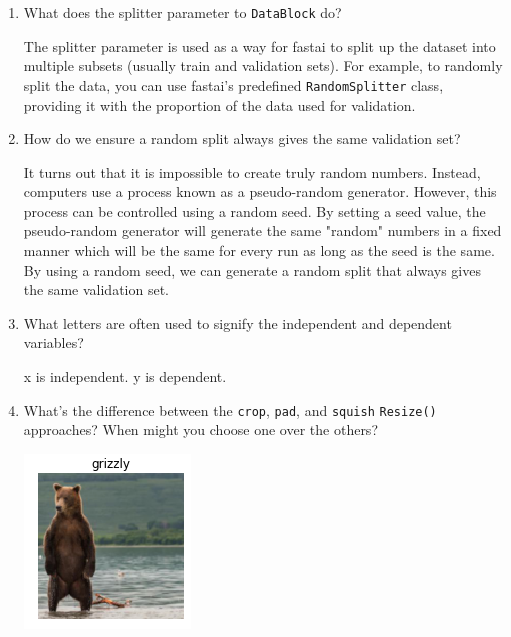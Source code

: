 \documentclass[12pt,a4paper]{article}
\begin{document}
\begin{enumerate}
\item What does the splitter parameter to \verb/DataBlock/ do? \\

\smallbreak

The splitter parameter is used as a way for fastai to split up the dataset into multiple subsets (usually train and validation sets). For example, to randomly split the data, you can use fastai's predefined \verb/RandomSplitter/ class, providing it with the proportion of the data used for validation.

\bigbreak

\item How do we ensure a random split always gives the same validation set? \\

\smallbreak

It turns out that it is impossible to create truly random numbers. Instead, computers use a process known as a pseudo-random generator. However, this process can be controlled using a random seed. By setting a seed value, the pseudo-random generator will generate the same "random" numbers in a fixed manner which will be the same for every run as long as the seed is the same. By using a random seed, we can generate a random split that always gives the same validation set.

\bigbreak

\item What letters are often used to signify the independent and dependent variables? \\

\smallbreak

x is independent. y is dependent.

\bigbreak

\item What's the difference between the \verb/crop/, \verb/pad/, and \verb/squish/ \verb/Resize()/ approaches? When might you choose one over the others? \\

\smallbreak

\begin{center}
\includegraphics[scale=1]{crop_grizzly}
\end{center}


\end{enumerate}
\end{document}

